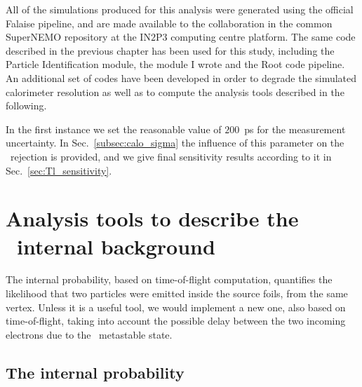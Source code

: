 All of the simulations produced for this analysis were generated using the official Falaise pipeline, and are made available to the collaboration in the common SuperNEMO repository at the IN$2$P$3$ computing centre platform.
The same code described in the previous chapter has been used for this study, including the Particle Identification module, the module I wrote and the Root code pipeline.
An additional set of codes have been developed in order to degrade the simulated calorimeter resolution as well as to compute the analysis tools described in the following.

In the first instance we set the reasonable value of $200$~ps for the measurement uncertainty.
In Sec.~\ref{subsec:calo_sigma} the influence of this parameter on the \Tl\ rejection is provided, and we give final sensitivity results according to it in Sec.~\ref{sec:Tl_sensitivity}.


\section{Analysis tools to describe the \Tl\ internal background}
\label{sec:Tl_TOF}

The internal probability, based on time-of-flight computation, quantifies the likelihood that two particles were emitted inside the source foils, from the same vertex.
Unless it is a useful tool, we would implement a new one, also based on time-of-flight, taking into account the possible delay between the two incoming electrons due to the \Pb\ metastable state.


\subsection{The internal probability}

